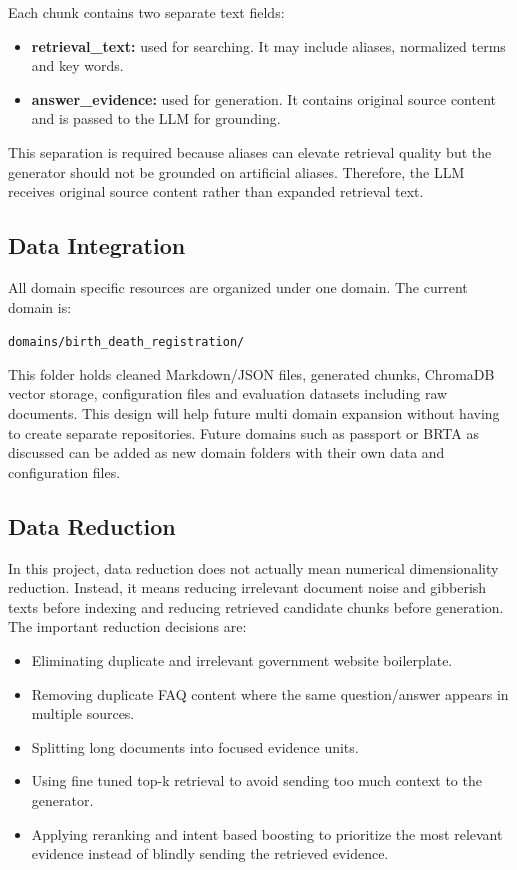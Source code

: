 Each chunk contains two separate text fields:

\begin{itemize}
    \item \textbf{retrieval\_text:} used for searching. It may include aliases, normalized terms and key words.
    \item \textbf{answer\_evidence:} used for generation. It contains original source content and is passed to the LLM for grounding.
\end{itemize}

This separation is required because aliases can elevate retrieval quality but the generator should not be grounded on artificial aliases. Therefore, the LLM receives original source content rather than expanded retrieval text.

\subsection{Data Integration}

All domain specific resources are organized under one domain. The current domain is:

\begin{center}
\texttt{domains/birth\_death\_registration/}
\end{center}

This folder holds cleaned Markdown/JSON files, generated chunks, ChromaDB vector storage, configuration files and evaluation datasets including raw documents. This design will help future multi domain expansion without having to create separate repositories. Future domains such as passport or BRTA as discussed can be added as new domain folders with their own data and configuration files.

\subsection{Data Reduction}

In this project, data reduction does not actually mean numerical dimensionality reduction. Instead, it means reducing irrelevant document noise and gibberish texts before indexing and reducing retrieved candidate chunks before generation. The important reduction decisions are:

\begin{itemize}
    \item Eliminating duplicate and irrelevant government website boilerplate.
    \item Removing duplicate FAQ content where the same question/answer appears in multiple sources.
    \item Splitting long documents into focused evidence units.
    \item Using fine tuned top-k retrieval to avoid sending too much context to the generator.
    \item Applying reranking and intent based boosting to prioritize the most relevant evidence instead of blindly sending the retrieved evidence.
\end{itemize}

